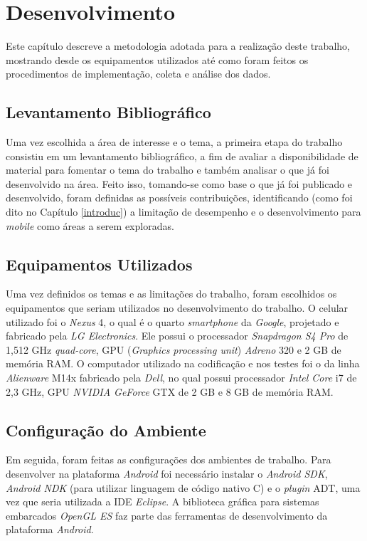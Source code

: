 \chapter[Desenvolvimento]{Desenvolvimento}

	Este capítulo descreve a metodologia adotada para a realização deste trabalho, mostrando desde os equipamentos utilizados até como foram feitos os procedimentos de implementação, coleta e análise dos dados. 

\section{Levantamento Bibliográfico}

Uma vez escolhida a área de interesse e o tema, a primeira etapa do trabalho consistiu em um levantamento bibliográfico, a fim de avaliar a disponibilidade de material para fomentar o tema do trabalho e também analisar o que já foi desenvolvido na área. Feito isso, tomando-se como base o que já foi publicado e desenvolvido, foram definidas as possíveis contribuições, identificando (como foi dito no Capítulo \ref{introduc}) a limitação de desempenho e o desenvolvimento para \textit{mobile} como áreas a serem exploradas.  

\section{Equipamentos Utilizados}

	Uma vez definidos os temas e as limitações do trabalho, foram escolhidos os equipamentos que seriam utilizados no desenvolvimento do trabalho. O celular utilizado foi o \textit{Nexus} 4, o qual é o quarto  \textit{smartphone} da  \textit{Google}, projetado e fabricado pela \textit{LG Electronics}.  Ele possui o processador \textit{Snapdragon S4 Pro} de 1,512 GHz \textit{quad-core}, GPU (\textit{Graphics processing unit}) \textit{Adreno} 320 e 2 GB de memória RAM. O computador utilizado na codificação e nos testes foi o da linha \textit{Alienware} M14x fabricado pela \textit{Dell}, no qual possui processador \textit{Intel Core} i7 de 2,3 GHz, GPU \textit{NVIDIA GeForce} GTX de 2 GB e 8 GB de memória RAM. 

\section{Configuração do Ambiente}
\label{configamb}	

	Em seguida, foram feitas as configurações dos ambientes de trabalho. Para desenvolver na plataforma \textit{Android} foi necessário instalar o \textit{Android SDK}, \textit{Android NDK} (para utilizar linguagem de código nativo C) e o \textit{plugin} ADT, uma vez que seria utilizada a IDE \textit{Eclipse}. A biblioteca gráfica para sistemas embarcados \textit{OpenGL ES} faz parte das ferramentas de desenvolvimento da plataforma \textit{Android}. 

